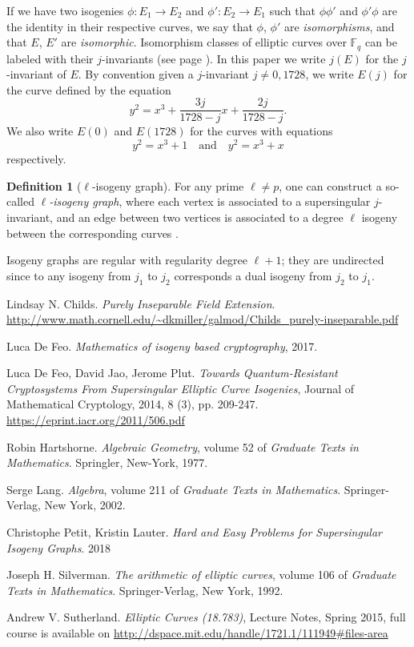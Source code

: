 \documentclass{article}
\theoremstyle{theorem}
\theoremstyle{definition}
\newtheorem{definition}{Definition}
\begin{document}
If we have two isogenies $\phi: E_1 \to E_2$ and $\phi': E_2 \to E_1$ such that $\phi\phi'$ and $\phi'\phi$ are the identity in their respective curves, we say that $\phi$, $\phi'$ are \textit{isomorphisms}, and that $E$, $E'$ are \textit{isomorphic}. Isomorphism classes of elliptic curves over $\mathbb{F}_q$ can be labeled with their $j$-invariants (see page \pageref{j-invariant}). In this paper we write $j(E)$ for the $j$-invariant of $E$. By convention given a $j$-invariant $j \neq 0, 1728$, we write $E(j)$ for the curve defined by the equation 
	\[y^2 = x^3 + \frac{3j}{1728 - j}x + \frac{2j}{1728 - j}. \]
We also write $E(0)$ and $E(1728)$ for the curves with equations
	\[y^2 = x^3 + 1 \quad \text{and} \quad y^2 = x^3 +x \]
respectively.

	\begin{definition}[$\ell$-isogeny graph]
		For any prime $\ell \neq p$, one can construct a so-called \textit{$\ell$-isogeny graph}, where each vertex is associated to a supersingular $j$-invariant, and an edge between two vertices is associated to a degree $\ell$ isogeny between the corresponding curves \cite[2.1]{HardEasyProbs}.
	\end{definition}

Isogeny graphs are regular with regularity degree $\ell + 1$; they are undirected since to any isogeny from $j_1$ to $j_2$ corresponds a dual isogeny from $j_2$ to $j_1$. 

\begin{thebibliography}{}
	 Lindsay N. Childs. \textit{Purely Inseparable Field Extension}. \url{http://www.math.cornell.edu/~dkmiller/galmod/Childs_purely-inseparable.pdf}
	
	 Luca De Feo. \textit{Mathematics of isogeny based cryptography}, 2017.
	
	 Luca De Feo, David Jao, Jerome Plut. \textit{Towards Quantum-Resistant Cryptosystems From Supersingular Elliptic Curve Isogenies}, Journal of Mathematical Cryptology, 2014, 8 (3), pp. 209-247. \url{https://eprint.iacr.org/2011/506.pdf}
	
	 Robin Hartshorne. \textit{Algebraic Geometry}, volume 52 of \textit{Graduate Texts in Mathematics}. Springler, New-York, 1977.
	
	 Serge Lang. \textit{Algebra}, volume 211 of \textit{Graduate Texts in Mathematics}. Springer-Verlag, New York, 2002.

	 Christophe Petit, Kristin Lauter. \textit{Hard and Easy Problems for Supersingular Isogeny Graphs}. 2018
	
	 Joseph H. Silverman. \textit{The arithmetic of elliptic curves}, volume 106 of \textit{Graduate Texts in Mathematics}. Springer-Verlag, New York, 1992.

	 Andrew V. Sutherland. \textit{  Elliptic Curves (18.783)}, Lecture Notes, Spring 2015, full course is available on \url{http://dspace.mit.edu/handle/1721.1/111949#files-area}
	
	
\end{thebibliography}
\end{document}
